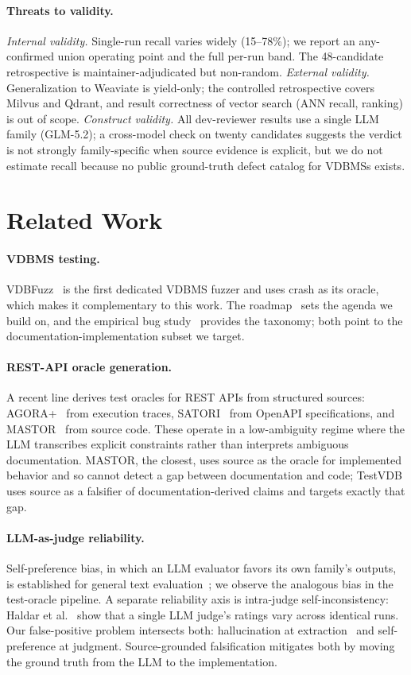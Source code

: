 \documentclass[sigconf]{acmart}
\begin{document}
\paragraph{Threats to validity.}
\emph{Internal validity.} Single-run recall varies widely (15--78\%); we report an any-confirmed union operating point and the full per-run band. The 48-candidate retrospective is maintainer-adjudicated but non-random. \emph{External validity.} Generalization to Weaviate is yield-only; the controlled retrospective covers Milvus and Qdrant, and result correctness of vector search (ANN recall, ranking) is out of scope. \emph{Construct validity.} All dev-reviewer results use a single LLM family (GLM-5.2); a cross-model check on twenty candidates suggests the verdict is not strongly family-specific when source evidence is explicit, but we do not estimate recall because no public ground-truth defect catalog for VDBMSs exists.
\section{Related Work}
\label{sec:related}

\paragraph{VDBMS testing.}
VDBFuzz~\cite{vdbfuzz26} is the first dedicated VDBMS fuzzer and uses crash as its oracle, which makes it complementary to this work. The roadmap~\cite{roadmap25} sets the agenda we build on, and the empirical bug study~\cite{bugstudy25} provides the taxonomy; both point to the documentation-implementation subset we target.

\paragraph{REST-API oracle generation.}
A recent line derives test oracles for REST APIs from structured sources: AGORA+~\cite{agoraplus25} from execution traces, SATORI~\cite{satori25} from OpenAPI specifications, and MASTOR~\cite{mastor26} from source code. These operate in a low-ambiguity regime where the LLM transcribes explicit constraints rather than interprets ambiguous documentation. MASTOR, the closest, uses source as the oracle for implemented behavior and so cannot detect a gap between documentation and code; TestVDB uses source as a falsifier of documentation-derived claims and targets exactly that gap.

\paragraph{LLM-as-judge reliability.}
Self-preference bias, in which an LLM evaluator favors its own family's outputs, is established for general text evaluation~\cite{panickssery24,wataoka24}; we observe the analogous bias in the test-oracle pipeline. A separate reliability axis is intra-judge self-inconsistency: Haldar et al.~\cite{haldar25} show that a single LLM judge's ratings vary across identical runs. Our false-positive problem intersects both: hallucination at extraction~\cite{ji23hall} and self-preference at judgment. Source-grounded falsification mitigates both by moving the ground truth from the LLM to the implementation.
\end{document}
